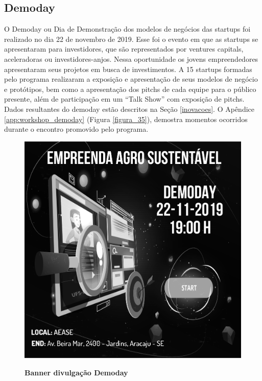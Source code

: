 \subsection{Demoday}

O Demoday ou Dia de Demonstração dos modelos de negócios das startups foi realizado no dia 22 de novembro de 2019. Esse foi o evento em que as startups se apresentaram para investidores, que são representados por ventures capitals, aceleradoras ou investidores-anjos. Nessa oportunidade os jovens empreendedores apresentaram seus projetos em busca de investimentos. A 15 startups formadas pelo programa realizaram a exposição e apresentação de seus modelos de negócio e protótipos, bem como a apresentação dos pitchs de cada equipe para o público presente, além de participação em um “Talk Show” com exposição de pitchs. Dados resultantes do demoday estão descritos na Seção \ref{inovacoes}. 
O Apêndice \ref{app:workshop_demoday} (Figura \ref{figura_35}), demostra momentos ocorridos durante o encontro promovido pelo programa.



\begin{figure}[H]
\centering
\caption{\textbf{Banner divulgação Demoday}}
\includegraphics[scale=0.3]{Imagens/demoday_banner.png}
\label{fig:ods}
\end{figure}


